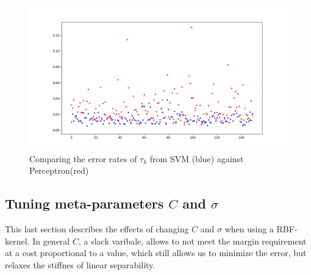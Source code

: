 \begin{figure}[!h]
\begin{center}
\centering
\includegraphics[width=1\textwidth]{figures/perc_svn_comparison.png}
\end{center}
\caption{\label{fig:error_SVM_perc} Comparing the error rates of $\tau_k$ from SVM (blue) against Perceptron(red) }
\end{figure}



\subsection{Tuning meta-parameters $C$ and $\sigma$}

This last section describes the effects of changing $C$ and $\sigma$ when using a RBF-kernel. In general $C$, a slack varibale, allows to not meet the margin requirement at a cost proportional to a value, which still allows us to minimize the error, but relaxes the stiffnes of linear separability.

%
%
%



